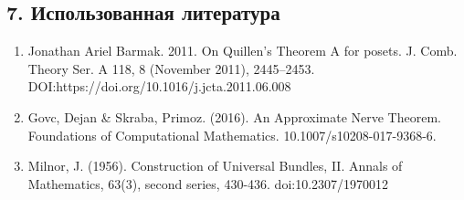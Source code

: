 \documentclass[a4paper, 12pt]{article}
\theoremstyle{definition}
\theoremstyle{remark}
\begin{document}
\subsection*{7. Использованная литература}
\begin{enumerate}
  \item Jonathan Ariel Barmak. 2011. On Quillen’s Theorem A for posets. J. Comb. Theory Ser. A 118, 8 (November 2011), 2445–2453. DOI:https://doi.org/10.1016/j.jcta.2011.06.008
  \item Govc, Dejan \& Skraba, Primoz. (2016). An Approximate Nerve Theorem. Foundations of Computational Mathematics. 10.1007/s10208-017-9368-6.
  \item Milnor, J. (1956). Construction of Universal Bundles, II. Annals of Mathematics, 63(3), second series, 430-436. doi:10.2307/1970012
\end{enumerate}
\end{document}
